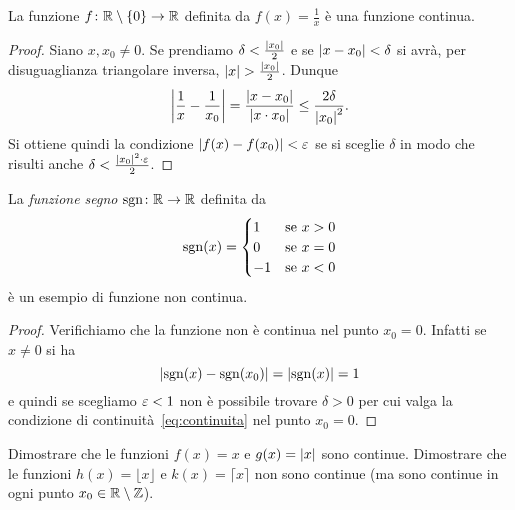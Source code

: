   \begin{theorem}
  \label{th:cont_reciproco}%
  La funzione $f\colon {\mathbb R}\setminus{\left\{ 0 \right\}}\to {\mathbb R}$ definita
  da $f(x)=\frac 1 x$ è una funzione continua.
  \end{theorem}
  \begin{proof}
  Siano $x,x_0\neq 0$.
  Se prendiamo $\delta < \frac{{\left|x_0\right|}}2$
  e se ${\left|x-x_0\right|} < \delta$ si avrà,
  per disuguaglianza triangolare inversa,
  ${\left|x\right|} > \frac{{\left|x_0\right|}}2$. Dunque
  \[
  {\left|\frac 1 x - \frac 1 {x_0}\right|}
  = \frac{{\left|x-x_0\right|}}{{\left|x\cdot x_0\right|}}
  \le \frac{2\delta}{{\left|x_0\right|}^2}.
  \]
  Si ottiene quindi la condizione ${\left|f(x)-f(x_0)\right|}<\varepsilon$
  se si sceglie $\delta$ in modo che
  risulti anche $\delta < \frac{{\left|x_0\right|}^2\cdot \varepsilon}{2}$.
  \end{proof}
  
  \begin{example}
  La \emph{funzione segno}%
%
 $\operatorname{sgn}\colon {\mathbb R} \to {\mathbb R}$ definita da
  \[
    \operatorname{sgn}(x) = \begin{cases}
    1 & \text{se $x> 0$}\\
    0 & \text{se $x=0$}\\
    -1 & \text{se $x<0$}
    \end{cases}
  \]
  è un esempio di funzione non continua.
  \end{example}
  \begin{proof}
  Verifichiamo che la funzione non è continua
  nel punto $x_0=0$.
  Infatti se $x\neq 0$ si ha
  \[
  {\left|\operatorname{sgn}(x)-\operatorname{sgn}(x_0)\right|} = {\left|\operatorname{sgn}(x)\right|} = 1
  \]
  e quindi se scegliamo $\varepsilon<1$ non è possibile
  trovare $\delta>0$ per cui valga la condizione
  di continuità~\eqref{eq:continuita}
  nel punto $x_0=0$.
  \end{proof}
  
  \begin{exercise}
  Dimostrare che le funzioni $f(x) = x$ e $g(x)={\left|x\right|}$ sono continue.
  Dimostrare che le funzioni $h(x) = \lfloor x\rfloor$ e $k(x)=\lceil x \rceil$
  non sono continue (ma sono continue in ogni punto
  $x_0\in {\mathbb R} \setminus {\mathbb Z}$).
  \end{exercise}
  
